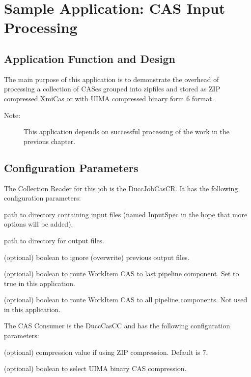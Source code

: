 \chapter{Sample Application: CAS Input Processing}

\section{Application Function and Design}
The main purpose of this application is to demonstrate the overhead of processing a collection of CASes grouped into 
zipfiles and stored as ZIP compressed XmiCas or with UIMA compressed binary form 6 format.

	\begin{description}
    \item[Note:] This application depends on successful processing of the work in the previous chapter.
	\end{description}

\section{Configuration Parameters}
The Collection Reader for this job is the DuccJobCasCR. It has the following configuration
parameters:

\begin{description}[labelindent=0.5in,leftmargin=0.5in]
    \item[InputSpec] path to directory containing input files (named InputSpec in the hope that more options will be added).
    \item[OutputDirectory] path to directory for output files.
    \item[IgnorePreviousOutput] (optional) boolean to ignore (overwrite) previous output files.
    \item[SendToLast] (optional) boolean to route WorkItem CAS to last pipeline component. Set to true in this application.
    \item[SendToAll] (optional) boolean to route WorkItem CAS to all pipeline components. Not used in this application.
\end{description}


The CAS Consumer is the DuccCasCC and has the following configuration parameters:

\begin{description}[labelindent=0.5in,leftmargin=0.5in]
  \item[XmiCompressionLevel] (optional) compression value if using ZIP compression. Default is 7.
  \item[UseBinaryCompression] (optional) boolean to select UIMA binary CAS compression.
\end{description}

